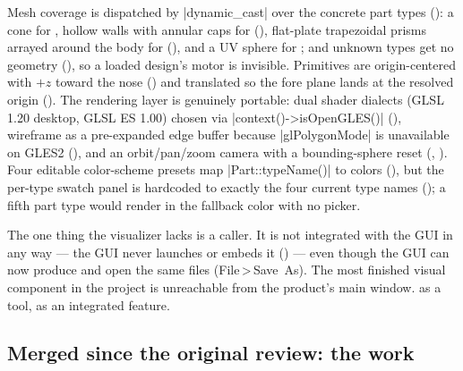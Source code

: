 Mesh coverage is dispatched by \cppinline|dynamic_cast| over the concrete part types
(): a cone for , hollow walls with
annular caps for  (), flat-plate trapezoidal
prisms arrayed around the body for  (), and a UV
sphere for ;  and unknown types get no geometry
(), so a loaded design's motor is invisible. Primitives are
origin-centered with $+z$ toward the nose () and translated so the
fore plane lands at the resolved origin (). The rendering layer
is genuinely portable: dual shader dialects (GLSL 1.20 desktop, GLSL ES 1.00) chosen via
\cppinline|context()->isOpenGLES()| (), wireframe as a
pre-expanded  edge buffer because \cppinline|glPolygonMode| is unavailable on
GLES2 (), and an orbit/pan/zoom camera with a
bounding-sphere reset (,
). Four editable color-scheme presets map
\cppinline|Part::typeName()| to colors (), but the per-type
swatch panel is hardcoded to exactly the four current type names
(); a fifth part type would render in the fallback color
with no picker.

The one thing the visualizer lacks is a caller. It is not integrated with the GUI in any way ---
the GUI never launches or embeds it () --- even though the GUI can now
produce and open the same  files (File\,>\,Save~As). The most finished visual component
in the project is unreachable from the product's main window. \fpresent{} as a tool, \fabsent{} as
an integrated feature.

\subsection{Merged since the original review: the
  \texorpdfstring{}{RocketTreeViewImplementation} work}%
\label{sec:interfaces-branch}

